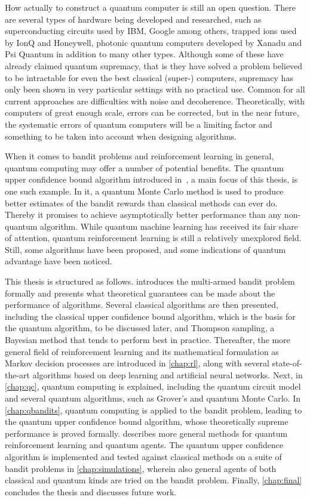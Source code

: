 How actually to construct a quantum computer is still an open question.
There are several types of hardware being developed and researched, such as superconducting circuits used by IBM, Google among others, trapped ions used by IonQ and Honeywell, photonic quantum computers developed by Xanadu and Psi Quantum in addition to many other types.
Although some of these have already claimed quantum supremacy, that is they have solved a problem believed to be intractable for even the best classical (super-) computers, supremacy has only been shown in very particular settings with no practical use.
Common for all current approaches are difficulties with noise and decoherence.
Theoretically, with computers of great enough scale, errors can be corrected, but in the near future, the systematic errors of quantum computers will be a limiting factor and something to be taken into account when designing algorithms.

When it comes to bandit problems and reinforcement learning in general, quantum computing may offer a number of potential benefits.
The quantum upper confidence bound algorithm introduced in~\autocite{wan2022}, a main focus of this thesis, is one such example.
In it, a quantum Monte Carlo method is used to produce better estimates of the bandit rewards than classical methods can ever do.
Thereby it promises to achieve asymptotically better performance than any non-quantum algorithm.
While quantum machine learning has received its fair share of attention, quantum reinforcement learning is still a relatively unexplored field.
Still, some algorithms have been proposed, and some indications of quantum advantage have been noticed.

This thesis is structured as follows.
 introduces the multi-armed bandit problem formally and presents what theoretical guarantees can be made about the performance of algorithms.
Several classical algorithms are then presented, including the classical upper confidence bound algorithm, which is the basis for the quantum algorithm, to be discussed later, and Thompson sampling, a Bayesian method that tends to perform best in practice.
Thereafter, the more general field of reinforcement learning and its mathematical formulation as Markov decision processes are introduced in \cref{chap:rl}, along with several state-of-the-art algorithms based on deep learning and artificial neural networks.
Next, in \cref{chap:qc}, quantum computing is explained, including the quantum circuit model and several quantum algorithms, such as Grover's and quantum Monte Carlo.
In \cref{chap:qbandits}, quantum computing is applied to the bandit problem, leading to the quantum upper confidence bound algorithm, whose theoretically supreme performance is proved formally.
 describes more general methods for quantum reinforcement learning and quantum agents.
The quantum upper confidence algorithm is implemented and tested against classical methods on a suite of bandit problems in \cref{chap:simulations}, wherein also general agents of both classical and quantum kinds are tried on the bandit problem.
Finally, \cref{chap:final} concludes the thesis and discusses future work.